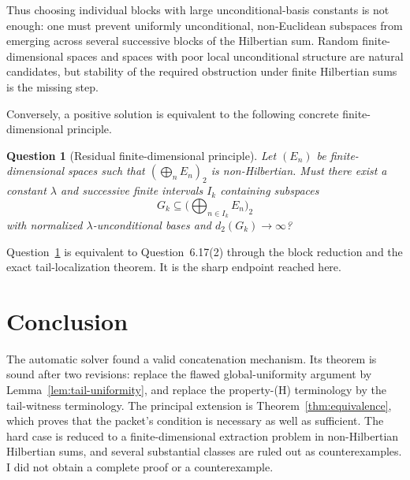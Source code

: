 \documentclass[11pt]{article}
\newtheorem{question}[theorem]{Question}
\theoremstyle{definition}
\newcommand{\dd}{d_2}
\begin{document}
Thus choosing individual blocks with large unconditional-basis constants is
not enough: one must prevent uniformly unconditional, non-Euclidean subspaces
from emerging across several successive blocks of the Hilbertian sum.  Random
finite-dimensional spaces and spaces with poor local unconditional structure
are natural candidates, but stability of the required obstruction under
finite Hilbertian sums is the missing step.

Conversely, a positive solution is equivalent to the following concrete
finite-dimensional principle.

\begin{question}[Residual finite-dimensional principle]\label{q:residual}
Let $(E_n)$ be finite-dimensional spaces such that
$(\bigoplus_n E_n)_2$ is non-Hilbertian.  Must there exist a constant
$\lambda$ and successive finite intervals $I_k$ containing subspaces
\[
  G_k\subseteq\Big(\bigoplus_{n\in I_k}E_n\Big)_2
\]
with normalized $\lambda$-unconditional bases and $\dd(G_k)\to\infty$?
\end{question}

Question~\ref{q:residual} is equivalent to Question~6.17(2) through the block
reduction and the exact tail-localization theorem.  It is the sharp endpoint
reached here.

\section{Conclusion}

The automatic solver found a valid concatenation mechanism.  Its theorem is
sound after two revisions: replace the flawed global-uniformity argument by
Lemma~\ref{lem:tail-uniformity}, and replace the property-(H) terminology by
the tail-witness terminology.  The principal extension is
Theorem~\ref{thm:equivalence}, which proves that the packet's condition is
necessary as well as sufficient.  The hard case is reduced to a
finite-dimensional extraction problem in non-Hilbertian Hilbertian sums, and
several substantial classes are ruled out as counterexamples.  I did not
obtain a complete proof or a counterexample.
\end{document}
